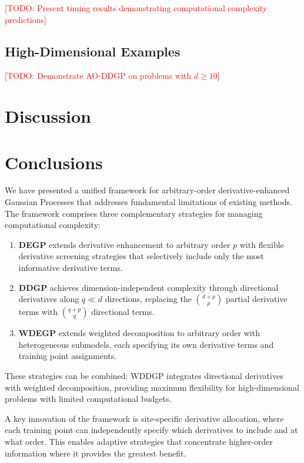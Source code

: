 \documentclass[12pt]{article}
\newcommand{\todo}[1]{\textcolor{red}{[TODO: #1]}}
\begin{document}
	\todo{Present timing results demonstrating computational complexity predictions}
	
	\subsection{High-Dimensional Examples}
	\label{subsec:exp_highdim}
	
	\todo{Demonstrate AO-DDGP on problems with $d \geq 10$}
	
	\section{Discussion}
	

\section{Conclusions}
\label{sec:conclusions}

We have presented a unified framework for arbitrary-order derivative-enhanced Gaussian Processes that addresses fundamental limitations of existing methods. The framework comprises three complementary strategies for managing computational complexity:

\begin{enumerate}
	\item \textbf{DEGP} extends derivative enhancement to arbitrary order $p$ with flexible derivative screening strategies that selectively include only the most informative derivative terms.
	
	\item \textbf{DDGP} achieves dimension-independent complexity through directional derivatives along $q \ll d$ directions, replacing the $\binom{d+p}{p}$ partial derivative terms with $\binom{q+p}{q}$ directional terms.
	
	\item \textbf{WDEGP} extends weighted decomposition to arbitrary order with heterogeneous submodels, each specifying its own derivative terms and training point assignments.
\end{enumerate}

These strategies can be combined: WDDGP integrates directional derivatives with weighted decomposition, providing maximum flexibility for high-dimensional problems with limited computational budgets.

A key innovation of the framework is site-specific derivative allocation, where each training point can independently specify which derivatives to include and at what order. This enables adaptive strategies that concentrate higher-order information where it provides the greatest benefit.
\end{document}
